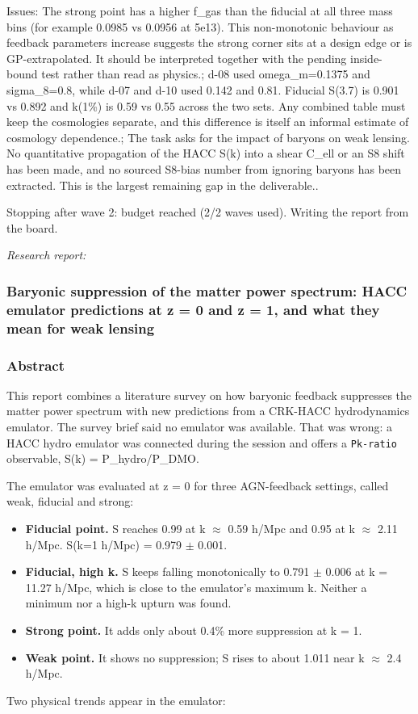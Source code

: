 \documentclass[11pt,a4paper]{article}
\begin{document}
Issues: The strong point has a higher f\_gas than the fiducial at all three mass bins (for example 0.0985 vs 0.0956 at 5e13). This non-monotonic behaviour as feedback parameters increase suggests the strong corner sits at a design edge or is GP-extrapolated. It should be interpreted together with the pending inside-bound test rather than read as physics.; d-08 used omega\_m=0.1375 and sigma\_8=0.8, while d-07 and d-10 used 0.142 and 0.81. Fiducial S(3.7) is 0.901 vs 0.892 and k(1\%) is 0.59 vs 0.55 across the two sets. Any combined table must keep the cosmologies separate, and this difference is itself an informal estimate of cosmology dependence.; The task asks for the impact of baryons on weak lensing. No quantitative propagation of the HACC S(k) into a shear C\_ell or an S8 shift has been made, and no sourced S8-bias number from ignoring baryons has been extracted. This is the largest remaining gap in the deliverable..

Stopping after wave 2: budget reached (2/2 waves used). Writing the report from the board.

\textit{Research report:}\par
\subsubsection*{Baryonic suppression of the matter power spectrum: HACC emulator predictions at z = 0 and z = 1, and what they mean for weak lensing}
\subsubsection*{Abstract}
This report combines a literature survey on how baryonic feedback suppresses the matter power spectrum with new predictions from a CRK-HACC hydrodynamics emulator. The survey brief said no emulator was available. That was wrong: a HACC hydro emulator was connected during the session and offers a \texttt{Pk-ratio} observable, S(k) = P\_hydro/P\_DMO.

The emulator was evaluated at z = 0 for three AGN-feedback settings, called weak, fiducial and strong:

\begin{itemize}
  \item \textbf{Fiducial point.} S reaches 0.99 at k $\approx$ 0.59 h/Mpc and 0.95 at k $\approx$ 2.11 h/Mpc. S(k=1 h/Mpc) = 0.979 $\pm$ 0.001.
  \item \textbf{Fiducial, high k.} S keeps falling monotonically to 0.791 $\pm$ 0.006 at k = 11.27 h/Mpc, which is close to the emulator's maximum k. Neither a minimum nor a high-k upturn was found.
  \item \textbf{Strong point.} It adds only about 0.4\% more suppression at k = 1.
  \item \textbf{Weak point.} It shows no suppression; S rises to about 1.011 near k $\approx$ 2.4 h/Mpc.
\end{itemize}
Two physical trends appear in the emulator:
\end{document}
